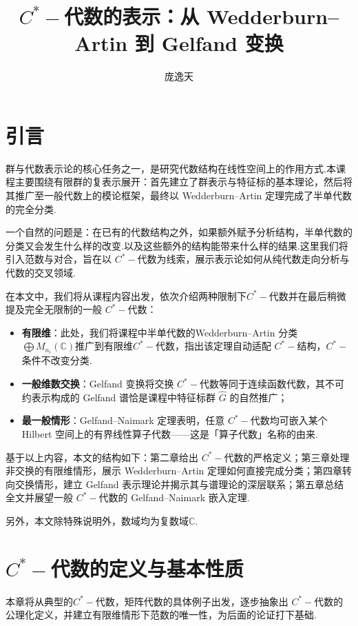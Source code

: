 \documentclass[math-font=lm, text-font=lm, math-style=TeX]{sjtureport}
\title{$C^*-\!$代数的表示：从 Wedderburn--Artin 到 Gelfand 变换}
\author{庞逸天}
\date{}
\theoremstyle{plain}
\theoremstyle{plain}
\begin{document}
\maketitle

\tableofcontents


\chapter{引言}

群与代数表示论的核心任务之一，是研究代数结构在线性空间上的作用方式.本课程主要围绕有限群的复表示展开：首先建立了群表示与特征标的基本理论，然后将其推广至一般代数上的模论框架，最终以 Wedderburn--Artin 定理完成了半单代数的完全分类.

一个自然的问题是：在已有的代数结构之外，如果额外赋予分析结构，半单代数的分类又会发生什么样的改变.以及这些额外的结构能带来什么样的结果.这里我们将引入范数与对合，旨在以 $C^*-\!$代数为线索，展示表示论如何从纯代数走向分析与代数的交叉领域.

在本文中，我们将从课程内容出发，依次介绍两种限制下$C^*-\!$代数并在最后稍微提及完全无限制的一般 $C^*-\!$代数：
\begin{itemize}
    \item \textbf{有限维}：此处，我们将课程中半单代数的Wedderburn--Artin 分类 $\bigoplus M_{n_i}(\mathbb{C})$推广到有限维$C^*-\!$代数，指出该定理自动适配 $C^*-\!$结构，$C^*-\!$条件不改变分类.
    \item \textbf{一般维数交换}：Gelfand 变换将交换 $C^*-\!$代数等同于连续函数代数，其不可约表示构成的 Gelfand 谱恰是课程中特征标群 $\widehat{G}$ 的自然推广；
    \item \textbf{最一般情形}：Gelfand--Naimark 定理表明，任意 $C^*-\!$代数均可嵌入某个 Hilbert 空间上的有界线性算子代数——这是「算子代数」名称的由来.
\end{itemize}

基于以上内容，本文的结构如下：第二章给出 $C^*-\!$代数的严格定义；第三章处理非交换的有限维情形，展示 Wedderburn--Artin 定理如何直接完成分类；第四章转向交换情形，建立 Gelfand 表示理论并揭示其与谱理论的深层联系；第五章总结全文并展望一般 $C^*-\!$代数的 Gelfand--Naimark 嵌入定理.

另外，本文除特殊说明外，数域均为复数域$\mathbb{C}$.

\chapter{$C^*-\!$代数的定义与基本性质}

本章将从典型的$C^*-$代数，矩阵代数的具体例子出发，逐步抽象出 $C^*-\!$代数的公理化定义，并建立有限维情形下范数的唯一性，为后面的论证打下基础.
\end{document}
